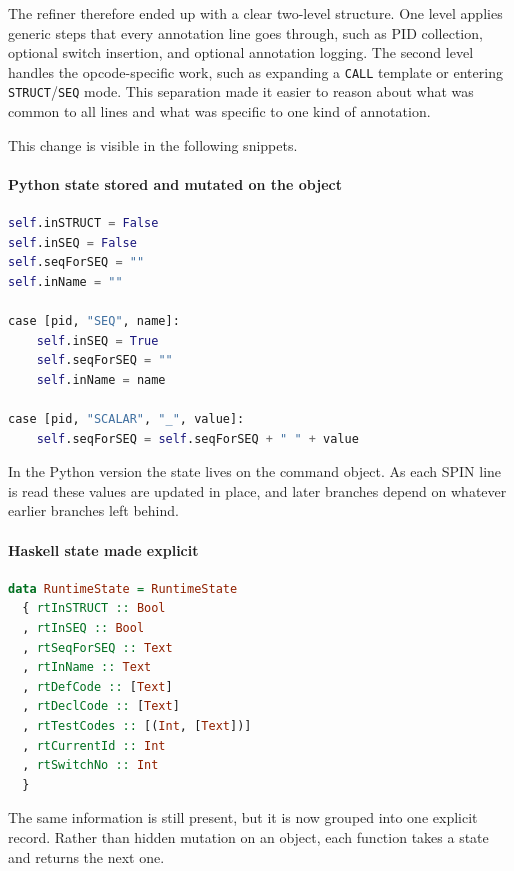 The refiner therefore ended up with a clear two-level structure. One
level applies generic steps that every annotation line goes through,
such as PID collection, optional switch insertion, and optional
annotation logging. The second level handles the opcode-specific work,
such as expanding a \texttt{CALL} template or entering
\texttt{STRUCT}/\texttt{SEQ} mode. This separation made it easier to
reason about what was common to all lines and what was specific to one
kind of annotation.

This change is visible in the following snippets.

\paragraph{Python state stored and mutated on the object}
\begin{lstlisting}[language=Python, caption={Python state stored and mutated on the object}, label={lst:python-state-mutation}]
self.inSTRUCT = False
self.inSEQ = False
self.seqForSEQ = ""
self.inName = ""

case [pid, "SEQ", name]:
    self.inSEQ = True
    self.seqForSEQ = ""
    self.inName = name

case [pid, "SCALAR", "_", value]:
    self.seqForSEQ = self.seqForSEQ + " " + value
\end{lstlisting}

In the Python version the state lives on the command object. As each
SPIN line is read these values are updated in place, and later
branches depend on whatever earlier branches left behind.

\paragraph{Haskell state made explicit}
\begin{lstlisting}[language=Haskell, caption={Explicit runtime state in the Haskell refiner}, label={lst:haskell-runtime-state}]
data RuntimeState = RuntimeState
  { rtInSTRUCT :: Bool
  , rtInSEQ :: Bool
  , rtSeqForSEQ :: Text
  , rtInName :: Text
  , rtDefCode :: [Text]
  , rtDeclCode :: [Text]
  , rtTestCodes :: [(Int, [Text])]
  , rtCurrentId :: Int
  , rtSwitchNo :: Int
  }
\end{lstlisting}

The same information is still present, but it is now grouped into one
explicit record. Rather than hidden mutation on an object, each
function takes a state and returns the next one.

